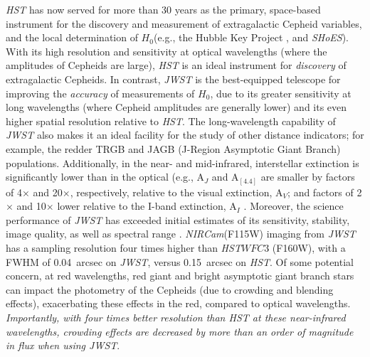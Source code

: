 \documentclass[12pt,modern]{aastex631}
\newcommand{\ho}{$H_{0}$\xspace}
\newcommand{\hst}{\emph{HST}\xspace}
\newcommand{\jwst}{\emph{JWST}\xspace}
\newcommand{\nircam}{\emph{NIRCam}\xspace}
\newcommand{\shoes}{\emph{SHoES}\xspace}
\begin{document}
\hst has now served for more than 30 years as the primary, space-based instrument for the discovery and measurement  of extragalactic Cepheid variables, and the local determination of \ho (e.g., the Hubble Key Project \citep{freedman_2001}, and \shoes \citep{riess_2022}). With its high resolution and sensitivity at optical wavelengths (where the amplitudes of Cepheids are large), \hst is an ideal instrument for {\it discovery} of extragalactic Cepheids. In contrast, \jwst is the best-equipped  telescope for improving the {\it accuracy} of measurements of \ho, due to  its greater sensitivity at long wavelengths (where Cepheid amplitudes are generally lower) and its even higher spatial resolution relative to \hst. The long-wavelength capability of \jwst also makes it an ideal facility for the study of other distance indicators; for example, the redder TRGB and JAGB (J-Region Asymptotic Giant Branch) populations. Additionally, in the near- and mid-infrared, interstellar extinction is significantly lower than in the optical  (e.g., A$_J$ and A$_{[4.4]}$ are smaller by factors of 4$\times$  and 20$\times$, respectively, relative to the visual extinction, A$_V$; and factors of 2$\times$  and 10$\times$ lower relative to the I-band extinction, A$_I$ \citep{cardelli_1989, indebetouw_2005}. Moreover, the science performance of \jwst has exceeded initial estimates of its sensitivity, stability, image quality, as well as spectral range \citep{rigby_2022}. \nircam (F115W) imaging from \jwst \citep{rieke_2023} has a sampling resolution four times higher than \hst $WFC3$ (F160W),  with a FWHM of 0.04~arcsec  on \jwst, versus 0.15~arcsec on \hst.  Of some potential concern, at red wavelengths, red giant and bright asymptotic giant branch stars can impact the photometry of the Cepheids (due to crowding and blending effects), exacerbating these effects in the red, compared to optical wavelengths. {\it Importantly, with four times better resolution than \hst at these near-infrared wavelengths, crowding effects are decreased by more than an order of magnitude in flux when using \jwst}. 
\end{document}
